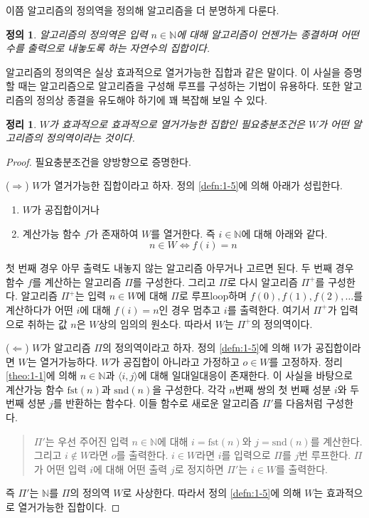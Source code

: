 \documentclass[a4paper,chapter,atbegshi]{oblivoir}
\newtheorem{defn}{정의}[chapter]
\newtheorem{theo}{정리}[chapter]
\begin{document}
이쯤 알고리즘의 정의역을 정의해 알고리즘을 더 분명하게 다룬다.
\begin{defn}
  알고리즘의 정의역은 입력 $n\in\mathbb{N}$에 대해 알고리즘이 언젠가는
  종결하며 어떤 수를 출력으로 내놓도록 하는 자연수의 집합이다. 
\end{defn}
알고리즘의 정의역은 실상 효과적으로 열거가능한 집합과 같은 말이다. 이 사실을
증명할 때는 알고리즘으로 알고리즘을 구성해 루프를 구성하는 기법이 유용하다.
또한 알고리즘의 정의상 종결을 유도해야 하기에 꽤 복잡해 보일 수 있다.
\begin{theo}\label{theo:1-7}
  $W$가 효과적으로 효과적으로 열거가능한 집합인 필요충분조건은 $W$가
  어떤 알고리즘의 정의역이라는 것이다.
\end{theo}
\begin{proof}
  필요충분조건을 양방향으로 증명한다.

  ($\Rightarrow$)
  $W$가 열거가능한 집합이라고 하자. 정의 \ref{defn:1-5}에 의해 아래가
  성립한다.
  \begin{enumerate}
    \item $W$가 공집합이거나
    \item 계산가능 함수 $f$가 존재하여 $W$를 열거한다. 즉 $i\in\mathbb{N}$에
      대해 아래와 같다.
      \[
        n\in W\iff f(i)=n
      \]
  \end{enumerate}
  첫 번째 경우 아무 출력도 내놓지 않는 알고리즘 아무거나 고르면 된다.
  두 번째 경우 함수 $f$를 계산하는 알고리즘 $\Pi$를 구성한다. 그리고 $\Pi$로
  다시 알고리즘 $\Pi^+$를 구성한다. 알고리즘 $\Pi^+$는 입력 $n\in W$에 대해
  $\Pi$로 루프{\tiny loop}하며 $f(0),f(1),f(2),\ldots$를 계산하다가 어떤 $i$에
  대해 $f(i)=n$인 경우 멈추고 $i$를 출력한다. 여기서 $\Pi^+$가 입력으로
  취하는 값 $n$은 $W$상의 임의의 원소다. 따라서 $W$는 $\Pi^+$의 정의역이다.

  ($\Leftarrow$) $W$가 알고리즘 $\Pi$의 정의역이라고 하자. 정의 \ref{defn:1-5}에
  의해 $W$가 공집합이라면 $W$는 열거가능하다. $W$가 공집합이 아니라고
  가정하고 $o\in W$를 고정하자.
  정리 \ref{theo:1-1}에 의해 $n\in\mathbb{N}$과 $\langle i,j\rangle$에 대해
  일대일대응이 존재한다.
  이 사실을 바탕으로 계산가능 함수 $\textrm{fst}(n)$과 $\textrm{snd}(n)$을 
  구성한다. 각각 $n$번째 쌍의 첫 번째 성분 $i$와 두 번째 성분 $j$를 반환하는
  함수다. 이들 함수로 새로운 알고리즘 $\Pi'$를 다음처럼 구성한다.
  \begin{quote}
  $\Pi'$는 우선 주어진 입력 $n\in\mathbb{N}$에 대해 $i=\textrm{fst}(n)$와
  $j=\textrm{snd}(n)$를 계산한다. 그리고 $i\notin W$라면 $o$를 출력한다. 
  $i\in W$라면 $i$를 입력으로 $\Pi$를 $j$번 루프한다. $\Pi$가 어떤 입력
  $i$에 대해 어떤 출력 $j$로 정지하면 $\Pi'$는 $i\in W$를 출력한다.
  \end{quote}
  즉 $\Pi'$는 $\mathbb{N}$를 $\Pi$의 정의역 $W$로 사상한다. 따라서 정의 
  \ref{defn:1-5}에 의해 $W$는 효과적으로 열거가능한 집합이다.
\end{proof}
\end{document}
